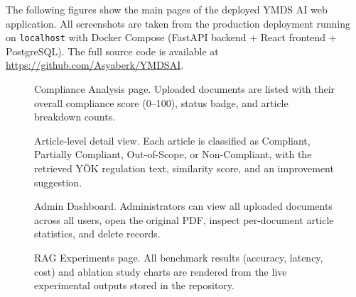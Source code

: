 \documentclass[a4paper,fleqn]{cas-dc}
\begin{document}
The following figures show the main pages of the deployed YMDS AI
web application. All screenshots are taken from the production deployment
running on \texttt{localhost} with Docker Compose
(FastAPI backend + React frontend + PostgreSQL).
The full source code is available at \url{https://github.com/Asyaberk/YMDSAI}.

\begin{figure}[H]
  \centering
  \caption{Compliance Analysis page. Uploaded documents are listed with
    their overall compliance score (0--100), status badge, and article
    breakdown counts.}
  \label{fig:app_analysis_list}
\end{figure}

\begin{figure}[H]
  \centering
  \caption{Article-level detail view. Each article is classified as
    Compliant, Partially Compliant, Out-of-Scope, or Non-Compliant, with
    the retrieved YÖK regulation text, similarity score, and
    an improvement suggestion.}
  \label{fig:app_article_detail}
\end{figure}

\begin{figure}[H]
  \centering
  \caption{Admin Dashboard. Administrators can view all uploaded documents
    across all users, open the original PDF, inspect per-document article
    statistics, and delete records.}
  \label{fig:app_admin}
\end{figure}

\begin{figure}[H]
  \centering
  \caption{RAG Experiments page. All benchmark results (accuracy, latency,
    cost) and ablation study charts are rendered from the live
    experimental outputs stored in the repository.}
  \label{fig:app_experiments}
\end{figure}
\end{document}
